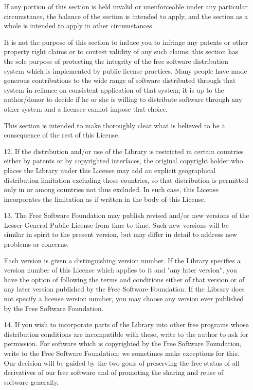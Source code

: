 \begin{DoxyCode}
If any portion of this section is held invalid or unenforceable under any
particular circumstance, the balance of the section is intended to apply,
and the section as a whole is intended to apply in other circumstances.

It is not the purpose of this section to induce you to infringe any
patents or other property right claims or to contest validity of any
such claims; this section has the sole purpose of protecting the
integrity of the free software distribution system which is
implemented by public license practices.  Many people have made
generous contributions to the wide range of software distributed
through that system in reliance on consistent application of that
system; it is up to the author/donor to decide if he or she is willing
to distribute software through any other system and a licensee cannot
impose that choice.

This section is intended to make thoroughly clear what is believed to
be a consequence of the rest of this License.

  12. If the distribution and/or use of the Library is restricted in
certain countries either by patents or by copyrighted interfaces, the
original copyright holder who places the Library under this License may add
an explicit geographical distribution limitation excluding those countries,
so that distribution is permitted only in or among countries not thus
excluded.  In such case, this License incorporates the limitation as if
written in the body of this License.

  13. The Free Software Foundation may publish revised and/or new
versions of the Lesser General Public License from time to time.
Such new versions will be similar in spirit to the present version,
but may differ in detail to address new problems or concerns.

Each version is given a distinguishing version number.  If the Library
specifies a version number of this License which applies to it and
"any later version", you have the option of following the terms and
conditions either of that version or of any later version published by
the Free Software Foundation.  If the Library does not specify a
license version number, you may choose any version ever published by
the Free Software Foundation.

  14. If you wish to incorporate parts of the Library into other free
programs whose distribution conditions are incompatible with these,
write to the author to ask for permission.  For software which is
copyrighted by the Free Software Foundation, write to the Free
Software Foundation; we sometimes make exceptions for this.  Our
decision will be guided by the two goals of preserving the free status
of all derivatives of our free software and of promoting the sharing
and reuse of software generally.


\end{DoxyCode}
